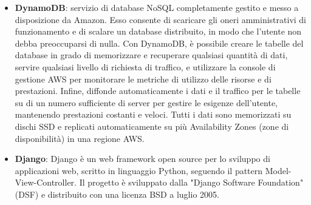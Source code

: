 \begin{itemize}
	\item \textbf{DynamoDB}: servizio di database NoSQL completamente gestito e messo a disposizione da Amazon. Esso consente di scaricare gli oneri amministrativi di funzionamento e di scalare un database distribuito, in modo che l'utente non debba preoccuparsi di nulla.
	Con DynamoDB, è possibile creare le tabelle del database in grado di memorizzare e recuperare qualsiasi quantità di dati, servire qualsiasi livello di richiesta di traffico, e utilizzare la console di gestione AWS per monitorare le metriche di utilizzo delle risorse e di prestazioni. Infine, diffonde automaticamente i dati e il traffico per le tabelle su di un numero sufficiente di server per gestire le esigenze dell'utente, mantenendo prestazioni costanti e veloci. Tutti i dati sono memorizzati su dischi SSD e replicati automaticamente su più Availability Zones (zone di disponibilità) in una regione AWS.
	\item \textbf{Django}: Django è un web framework open source per lo sviluppo di applicazioni web, scritto in linguaggio Python, seguendo il pattern Model-View-Controller.
	Il progetto è sviluppato dalla "Django Software Foundation" (DSF) e distribuito con una licenza BSD a luglio 2005.
\end{itemize}